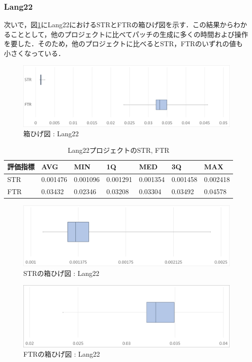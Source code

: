 \documentclass[uplatex,dvipdfmx,a4paper]{jsarticle}
\begin{document}
\subsubsection{Lang22}
次いで，図\ref{fig:Lang22_boxplot}にLang22におけるSTRとFTRの箱ひげ図を示す．この結果からわかることとして，他のプロジェクトに比べてパッチの生成に多くの時間および操作を要した．そのため，他のプロジェクトに比べるとSTR，FTRのいずれの値も小さくなっている．
\begin{figure}[t]
  \centering
  \includegraphics[width=\linewidth]{fig/Lang22_boxplot.png}
  \caption{箱ひげ図 : Lang22}
  \label{fig:Lang22_boxplot}
\end{figure}
\begin{table}[b]
  \centering
  \caption{Lang22プロジェクトのSTR, FTR}
  \label{tab:Lang22}
  \begin{tabular}{l|llllll} \hline\hline
    評価指標 & AVG         & MIN & 1Q & MED & 3Q & MAX   \\\hline
    STR & 0.001476 & 0.001096 & 0.001291 & 0.001354 & 0.001458 & 0.002418  \\
    FTR & 0.03432 & 0.02346 & 0.03208 & 0.03304 & 0.03492 & 0.04578 \\\hline\hline
  \end{tabular}
\end{table}
\begin{figure}[t]
  \centering
  \includegraphics[width=\linewidth]{fig/Lang22_boxplot_STR.png}
  \caption{STRの箱ひげ図 : Lang22}
  \label{fig:Lang22_boxplot_STR}
\end{figure}
\begin{figure}[t]
  \centering
  \includegraphics[width=\linewidth]{fig/Lang22_boxplot_FTR.png}
  \caption{FTRの箱ひげ図 : Lang22}
  \label{fig:Lang22_boxplot_FTR}
\end{figure}
\end{document}
